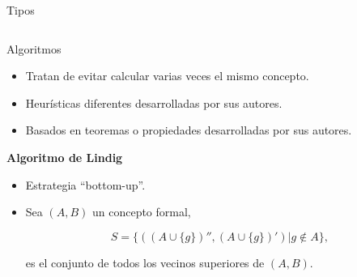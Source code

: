 \documentclass{beamer}
\begin{document}
\begin{frame}{Tipos}
\begin{columns}[c]
      \end{columns}

  \end{frame}
  
\begin{frame}{Algoritmos}
    \begin{itemize}
        \item Tratan de evitar calcular varias veces el mismo concepto. 
    
        \item Heurísticas diferentes desarrolladas por sus autores.
    
     \item Basados en teoremas o propiedades desarrolladas por sus autores.
    \end{itemize}
    \pause

     \begin{block}{\textbf{Algoritmo de Lindig}}
     \begin{itemize}

   \justifying
   \item Estrategia ``bottom-up''.
   
   \item Sea $(A,B)$ un concepto formal, 
   \begin{small}
   $$S=\{((A \cup \{g\})'',(A\cup \{g\})') | g \notin A\},$$ 
   \end{small}
   es el conjunto de todos los vecinos superiores de $(A,B)$.
   
   \end{itemize}
  \end{block}
    
    
    
  \end{frame}
  
\end{document}
